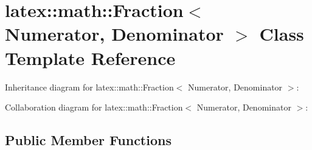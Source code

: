 \hypertarget{classlatex_1_1math_1_1Fraction}{\section{latex\-:\-:math\-:\-:\-Fraction$<$ \-Numerator, \-Denominator $>$ \-Class \-Template \-Reference}
\label{classlatex_1_1math_1_1Fraction}
}


\-Inheritance diagram for latex\-:\-:math\-:\-:\-Fraction$<$ \-Numerator, \-Denominator $>$\-:


\-Collaboration diagram for latex\-:\-:math\-:\-:\-Fraction$<$ \-Numerator, \-Denominator $>$\-:
\subsection*{\-Public \-Member \-Functions}
